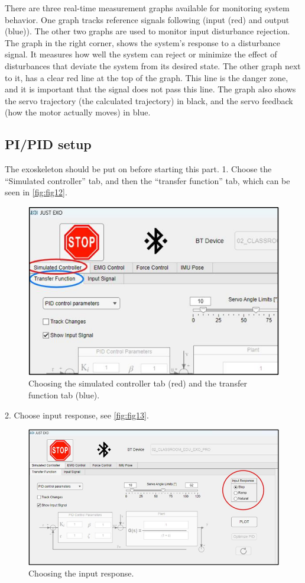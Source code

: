 There are three real-time measurement graphs available for monitoring system behavior. One graph tracks reference signals following (input (red) and output (blue)). The other two graphs are used to monitor input disturbance rejection. The graph in the right corner, shows the system's response to a disturbance signal. It measures how well the system can reject or minimize the effect of disturbances that deviate the system from its desired state. The other graph next to it, has a clear red line at the top of the graph. This line is the danger zone, and it is important that the signal does not pass this line. The graph also shows the servo trajectory (the calculated trajectory) in black, and the servo feedback (how the motor actually moves) in blue.

\newpage
\subsection{PI/PID setup}
The exoskeleton should be put on before starting this part.
1.	Choose the “Simulated controller” tab, and then the “transfer function” tab, which can be seen in \autoref{fig:fig12}.

\begin{figure}[H]
	\centering
	\includegraphics[width=0.7\linewidth]{img/fig_12}
	\caption{Choosing the simulated controller tab (red) and the transfer function tab (blue).}
	\label{fig:fig12}
\end{figure}


2.	Choose input response, see \autoref{fig:fig13}.
\begin{figure}[H]
	\centering
	\includegraphics[width=0.7\linewidth]{img/fig_13}
	\caption{Choosing the input response.}
	\label{fig:fig13}
\end{figure}

